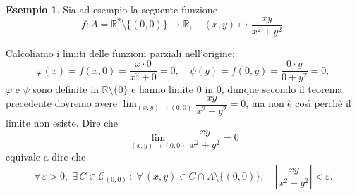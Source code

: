 \documentclass{article}
\theoremstyle{plain}
\theoremstyle{definition}
\newtheorem{exmp}{Esempio}[section]
\theoremstyle{remark}
\begin{document}
\vspace{10pt}

\begin{exmp} 
    Sia ad esempio la seguente funzione 
    \[f:A=\mathbb{R}^2\setminus\{(0,0)\}\to\mathbb{R},\quad (x,y)\mapsto\dfrac{xy}{x^2+y^2}.\]
    \begin{center}
        \hspace{1cm}
    \end{center}
    Calcoliamo i limiti delle funzioni parziali nell'origine: 
    \[\varphi(x)=f(x,0)=\dfrac{x\cdot0}{x^2+0}=0,\quad\psi(y)=f(0,y)=\dfrac{0\cdot y}{0+y^2}=0,\]
    $\varphi$ e $\psi$ sono definite in $\mathbb{R}\setminus\{0\}$ e hanno limite $0$ in $0$, dunque secondo il teorema precedente dovremo avere $\lim_{(x,y)\to(0,0)}\dfrac{xy}{x^2+y^2}=0$, ma non è così perchè il limite non esiste.
    Dire che 
    \[\lim_{(x,y)\to(0,0)}\dfrac{xy}{x^2+y^2}=0\]
    equivale a dire che 
    \[\forall\,\varepsilon>0,\;\exists\,C\in\mathcal{C}_{(0,0)}\,:\;\forall\,(x,y)\in C\cap A\setminus\{(0,0)\},\quad\left|\dfrac{xy}{x^2+y^2}\right|<\varepsilon.\]

\end{exmp}
\end{document}

